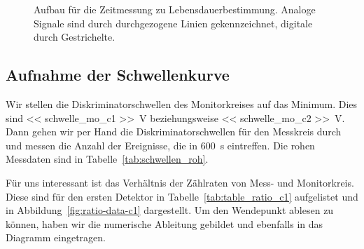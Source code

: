 \documentclass[11pt, ngerman, fleqn, DIV=15, headinclude, BCOR=2cm]{scrreprt}
\begin{document}
\begin{figure}[htbp]
    \centering
    \caption{%
        Aufbau für die Zeitmessung zu Lebensdauerbestimmung. Analoge Signale
        sind durch durchgezogene Linien gekennzeichnet, digitale durch
        Gestrichelte.
    }
    \label{fig:myon-zeit}
\end{figure}

\subsection{Aufnahme der Schwellenkurve}

Wir stellen die Diskriminatorschwellen des Monitorkreises auf das Minimum.
Dies sind \SI{<< schwelle_mo_c1 >>}{\volt} beziehungsweise \SI{<<
schwelle_mo_c2 >>}{\volt}. Dann gehen wir per Hand die
Diskriminatorschwellen für den Messkreis durch und messen die Anzahl der
Ereignisse, die in \SI{600}{\second} eintreffen. Die rohen Messdaten sind in
Tabelle~\ref{tab:schwellen_roh}.

Für uns interessant ist das Verhältnis der Zählraten von Mess- und
Monitorkreis. Diese sind für den ersten Detektor in
Tabelle~\ref{tab:table_ratio_c1} aufgelistet und in
Abbildung~\ref{fig:ratio-data-c1} dargestellt. Um den Wendepunkt ablesen zu
können, haben wir die numerische Ableitung gebildet und ebenfalls in das
Diagramm eingetragen.
\end{document}
